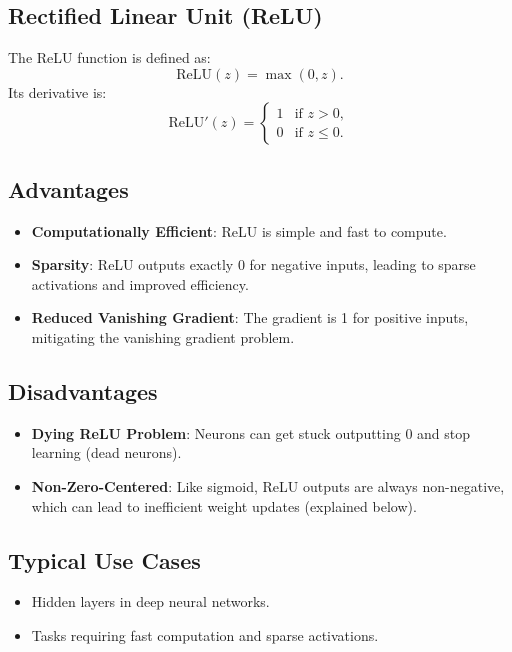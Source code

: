 \begin{notechapter}
\section{Rectified Linear Unit (ReLU)}
The ReLU function is defined as:
\[
\text{ReLU}(z) = \max(0, z).
\]
Its derivative is:
\[
\text{ReLU}'(z) = \begin{cases}
    1 & \text{if } z > 0, \\
    0 & \text{if } z \leq 0.
\end{cases}
\]

\subsection{Advantages}
\begin{itemize}[leftmargin=*]
    \item \textbf{Computationally Efficient}: ReLU is simple and fast to compute.
    \item \textbf{Sparsity}: ReLU outputs exactly 0 for negative inputs, leading
    to sparse activations and improved efficiency.
    \item \textbf{Reduced Vanishing Gradient}: The gradient is 1 for positive
    inputs, mitigating the vanishing gradient problem.
\end{itemize}

\subsection{Disadvantages}
\begin{itemize}[leftmargin=*]
    \item \textbf{Dying ReLU Problem}: Neurons can get stuck outputting 0 and
    stop learning (dead neurons).
    \item \textbf{Non-Zero-Centered}: Like sigmoid, ReLU outputs are always
    non-negative, which can lead to inefficient weight updates (explained below).
\end{itemize}

\subsection{Typical Use Cases}
\begin{itemize}[leftmargin=*]
    \item Hidden layers in deep neural networks.
    \item Tasks requiring fast computation and sparse activations.
\end{itemize}


\end{notechapter}
